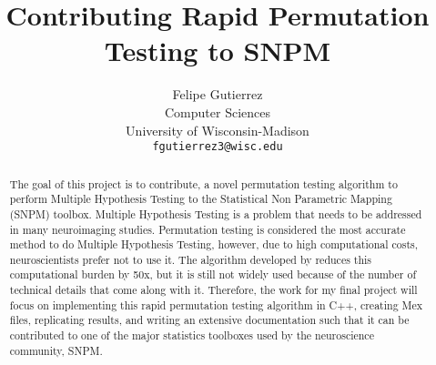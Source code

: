 \documentclass[10pt,letterpaper]{article}
\begin{document}
\title{Contributing Rapid Permutation Testing to SNPM}

\author{Felipe Gutierrez\\
Computer Sciences\\
University of Wisconsin-Madison\\
{\tt\small fgutierrez3@wisc.edu}
}

\maketitle

\begin{abstract}
The goal of this project is to contribute, a novel permutation testing algorithm to perform Multiple Hypothesis Testing to the Statistical Non Parametric Mapping (SNPM) toolbox. Multiple Hypothesis Testing is a problem that needs to be addressed in many neuroimaging studies. Permutation testing is considered the most accurate method to do Multiple Hypothesis Testing, however, due to high computational costs, neuroscientists prefer not to use it. The algorithm developed by \cite{vamsi} reduces this computational burden by 50x, but it is still not widely used because of the number of technical details that come along with it. Therefore, the work for my final project will focus on implementing this rapid permutation testing algorithm in C++, creating Mex files, replicating results, and writing an extensive documentation such that it can be contributed to one of the major statistics toolboxes used by the neuroscience community, SNPM.
\end{abstract}

\end{document}
